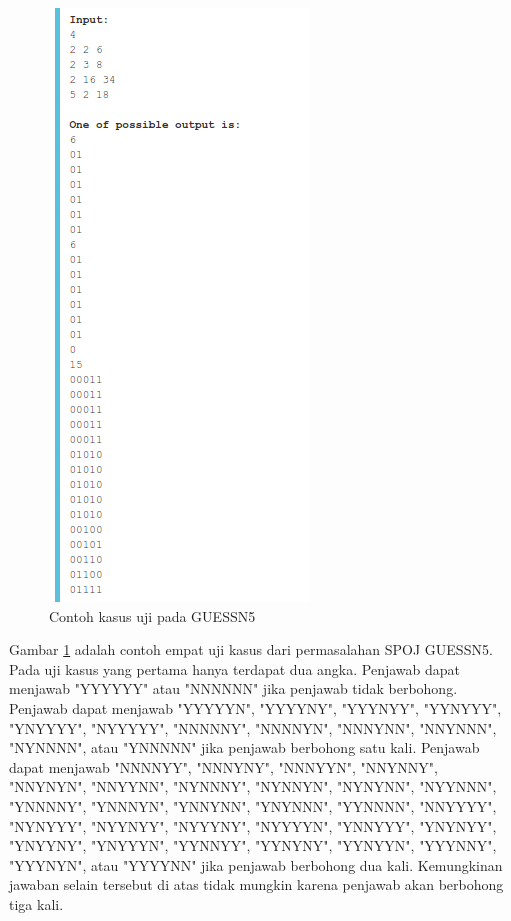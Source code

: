 \documentclass[conference,compsoc]{IEEEtran}
\begin{document}
\begin{figure}
\centering
\includegraphics[scale=0.6]{../img/example.png}
\caption{Contoh kasus uji pada GUESSN5}
\label{fig:guessn5_test_case}
\end{figure}

Gambar \ref{fig:guessn5_test_case} adalah contoh empat uji kasus dari permasalahan SPOJ GUESSN5. Pada uji kasus yang pertama hanya terdapat dua angka. Penjawab dapat menjawab "YYYYYY" atau "NNNNNN" jika penjawab tidak berbohong. Penjawab dapat menjawab "YYYYYN", "YYYYNY", "YYYNYY", "YYNYYY", "YNYYYY", "NYYYYY", "NNNNNY", "NNNNYN", "NNNYNN", "NNYNNN", "NYNNNN", atau "YNNNNN" jika penjawab berbohong satu kali. Penjawab dapat menjawab "NNNNYY", "NNNYNY", "NNNYYN", "NNYNNY", "NNYNYN", "NNYYNN", "NYNNNY", "NYNNYN", "NYNYNN", "NYYNNN", "YNNNNY", "YNNNYN", "YNNYNN", "YNYNNN", "YYNNNN", "NNYYYY", "NYNYYY", "NYYNYY", "NYYYNY", "NYYYYN", "YNNYYY", "YNYNYY", "YNYYNY", "YNYYYN", "YYNNYY", "YYNYNY", "YYNYYN", "YYYNNY", "YYYNYN", atau "YYYYNN" jika penjawab berbohong dua kali. Kemungkinan jawaban selain tersebut di atas tidak mungkin karena penjawab akan berbohong tiga kali.
\end{document}
